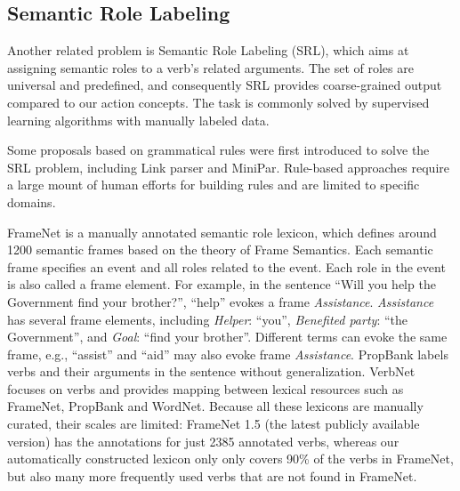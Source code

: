 
\subsection{Semantic Role Labeling}
Another related problem is Semantic Role Labeling (SRL), which aims at
assigning semantic roles to a verb's related arguments.
The set of roles are universal and predefined,
and consequently SRL provides coarse-grained output compared
to our action concepts. The task is commonly solved
by supervised learning algorithms with manually labeled data.

Some proposals based on grammatical rules were first introduced to solve
the SRL problem, including Link parser\cite{sleator1995parsing} and
MiniPar\cite{lin1994principar}. Rule-based approaches require
a large mount of human efforts for building rules and are limited to specific domains.

FrameNet is a manually annotated semantic role lexicon,
which defines around 1200 semantic frames based on
the theory of Frame Semantics. Each semantic frame specifies an event
and all roles related to the event. Each role in the event
is also called a frame element.
For example, in the sentence ``Will you help the Government
find your brother?'',
``help'' evokes a frame {\em Assistance}.
{\em Assistance} has several frame elements,
including {\em Helper}: ``you'', {\em Benefited party}:
``the Government'', and {\em Goal}: ``find your brother''.
Different terms can evoke the same frame, e.g., ``assist''
and ``aid'' may also evoke frame {\em Assistance}.
PropBank labels verbs and their arguments
in the sentence without generalization.
VerbNet\cite{KipperDP00} focuses on verbs and provides mapping
between lexical resources such as FrameNet, PropBank and WordNet.
Because all these lexicons are manually curated, their scales are
limited: FrameNet 1.5 (the latest publicly available  version) 
has the annotations for just 2385 annotated verbs, 
whereas our automatically constructed lexicon only only 
covers 90\% of the verbs in FrameNet,
but also many more frequently used verbs that are not found in
FrameNet.  

